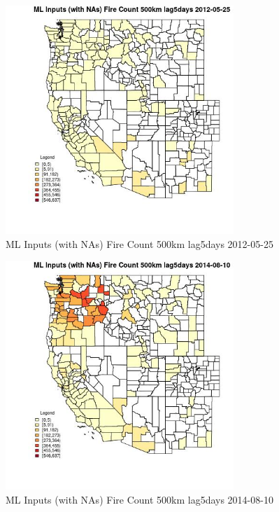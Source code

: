 \begin{figure} 
\centering  
\includegraphics[width=0.77\textwidth]{Code_Outputs/Report_ML_input_PM25_Step4_part_e_de_duplicated_aves_compiled_2019-05-18wNAs_CountyFire_Count_500km_lag5daysMean2012-05-25.jpg} 
\caption{\label{fig:Report_ML_input_PM25_Step4_part_e_de_duplicated_aves_compiled_2019-05-18wNAsCountyFire_Count_500km_lag5daysMean2012-05-25}ML Inputs (with NAs) Fire Count 500km lag5days 2012-05-25} 
\end{figure} 
 

\begin{figure} 
\centering  
\includegraphics[width=0.77\textwidth]{Code_Outputs/Report_ML_input_PM25_Step4_part_e_de_duplicated_aves_compiled_2019-05-18wNAs_CountyFire_Count_500km_lag5daysMean2014-08-10.jpg} 
\caption{\label{fig:Report_ML_input_PM25_Step4_part_e_de_duplicated_aves_compiled_2019-05-18wNAsCountyFire_Count_500km_lag5daysMean2014-08-10}ML Inputs (with NAs) Fire Count 500km lag5days 2014-08-10} 
\end{figure} 
 

